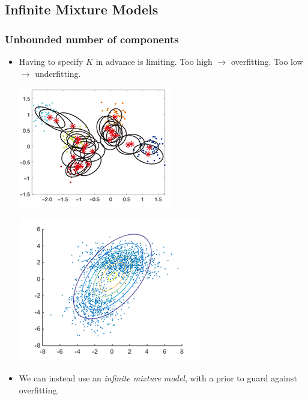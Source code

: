 \documentclass[11pt, mathserif, handout, table]{beamer}
\begin{document}
\subsection{Infinite Mixture Models}
\label{sec:dirichl-proc-mixt}
\begin{frame}
  \frametitle{Unbounded number of components}
  \begin{itemize}[<+->]
  \item Having to specify $K$ in advance is limiting.  Too high $\to$
    overfitting.  Too low $\to$ underfitting.
  \begin{minipage}{0.4\textwidth}
    \includegraphics[width=\textwidth]{img/overfitting.png}
  \end{minipage}
  \hspace{0.1in}
  \begin{minipage}{0.4\textwidth}
    \includegraphics[width=\textwidth]{img/underfitting.png}
  \end{minipage}
  \item We can instead use an {\it infinite mixture model}, with a
    prior to guard against overfitting.
  \end{itemize}
\end{frame}
\end{document}
